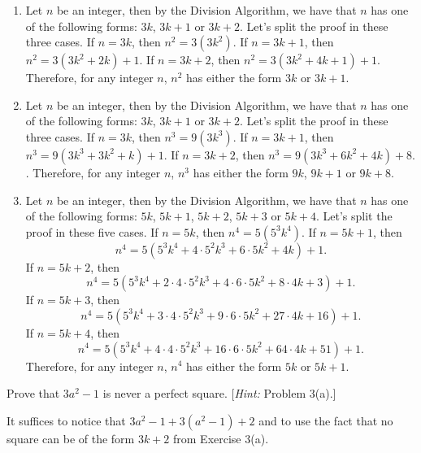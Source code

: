 \begin{solution}
    \begin{enumerate}
        \item Let $n$ be an integer, then by the Division Algorithm, we have that $n$ has one of the following forms: $3k$, $3k+1$ or $3k+2$. Let's split the proof in these three cases. If $n = 3k$, then $n^2 = 3(3k^2)$. If $n = 3k+1$, then $n^2 = 3(3k^2 + 2k) + 1$. If $n = 3k+2$, then $n^2 = 3(3k^2 + 4k + 1) + 1$. Therefore, for any integer $n$, $n^2$ has either the form $3k$ or $3k+1$.
        \item Let $n$ be an integer, then by the Division Algorithm, we have that $n$ has one of the following forms: $3k$, $3k+1$ or $3k+2$. Let's split the proof in these three cases. If $n = 3k$, then $n^3 = 9(3k^3)$. If $n = 3k+1$, then $n^3 = 9(3k^3 + 3k^2 + k) + 1.$ If $n = 3k+2$, then $n^3 = 9(3k^3 + 6k^2 + 4k) + 8.$. Therefore, for any integer $n$, $n^3$ has either the form $9k$, $9k+1$ or $9k + 8$.
        \item Let $n$ be an integer, then by the Division Algorithm, we have that $n$ has one of the following forms: $5k$, $5k+1$, $5k+2$, $5k+3$ or $5k+4$. Let's split the proof in these five cases. If $n = 5k$, then $n^4 = 5(5^3k^4)$. If $n = 5k+1$, then
        $$n^4 = 5(5^3k^4 + 4\cdot 5^2 k^3 + 6\cdot 5 k^2 + 4k) + 1.$$
        If $n = 5k+2$, then
        $$n^4 = 5(5^3k^4 + 2\cdot 4\cdot 5^2 k^3 + 4 \cdot 6\cdot 5 k^2 + 8\cdot 4k + 3) + 1.$$
        If $n = 5k+3$, then
        $$n^4 = 5(5^3k^4 + 3\cdot 4\cdot 5^2 k^3 + 9 \cdot 6\cdot 5 k^2 + 27\cdot 4k + 16) + 1.$$
        If $n = 5k+4$, then
        $$n^4 = 5(5^3k^4 + 4\cdot 4\cdot 5^2 k^3 + 16 \cdot 6\cdot 5 k^2 + 64\cdot 4k + 51) + 1.$$
        Therefore, for any integer $n$, $n^4$ has either the form $5k$ or $5k + 1$.
    \end{enumerate}
\end{solution}

\begin{exercise}
    Prove that $3a^2 - 1$ is never a perfect square. [\textit{Hint:} Problem 3(a).] \\
\end{exercise}

\begin{solution}
    It suffices to notice that $3a^2 - 1 + 3(a^2 - 1) + 2$ and to use the fact that no square can be of the form $3k+2$ from Exercise 3(a). \\
\end{solution}

